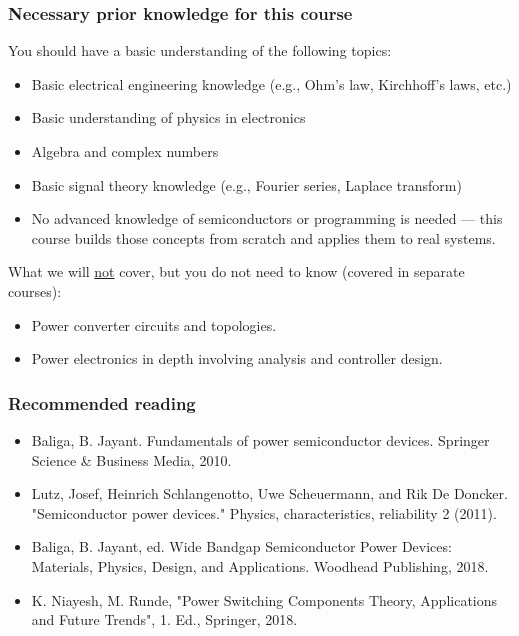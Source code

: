 \begin{frame}
	\frametitle{Necessary prior knowledge for this course}
	You should have a basic understanding of the following topics:
	\begin{itemize}
		\item Basic electrical engineering knowledge (e.g., Ohm's law, Kirchhoff's laws, etc.)
		\item Basic understanding of physics in electronics
		\item Algebra and complex numbers
		\item Basic signal theory knowledge (e.g., Fourier series, Laplace transform)
		\item No advanced knowledge of semiconductors or programming is needed — this course builds those concepts from scratch and applies them to real systems.
	\end{itemize}
	\vspace{0.5cm}
	What we will \underline{not} cover, but you do not need to know (covered in separate courses):
	\begin{itemize}
		\item Power converter circuits and topologies.
		\item Power electronics in depth involving analysis and controller design. 
	\end{itemize}
\end{frame}

\begin{frame}
	\frametitle{Recommended reading}
	\begin{itemize}
		\item Baliga, B. Jayant. Fundamentals of power semiconductor devices. Springer Science \& Business Media, 2010.
		\item Lutz, Josef, Heinrich Schlangenotto, Uwe Scheuermann, and Rik De Doncker. "Semiconductor power devices." Physics, characteristics, reliability 2 (2011).
		\item Baliga, B. Jayant, ed. Wide Bandgap Semiconductor Power Devices: Materials, Physics, Design, and Applications. Woodhead Publishing, 2018.
		\item K. Niayesh, M. Runde, "Power Switching Components Theory, Applications and Future Trends", 1. Ed., Springer, 2018.
	\end{itemize}
\end{frame}